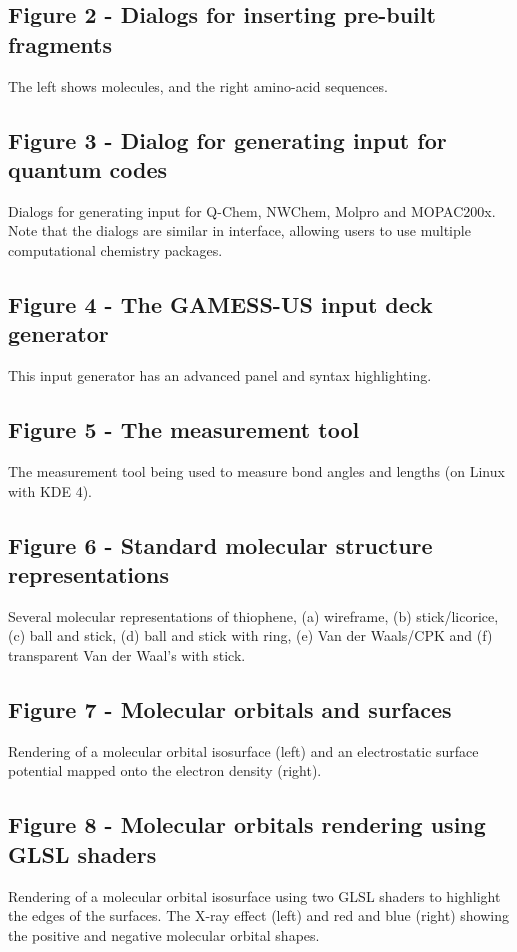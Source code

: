 \documentclass[10pt]{bmc_article}
\newenvironment{bmcformat}{\begin{raggedright}
  \baselineskip20pt\sloppy\setboolean{publ}{false}}{\end{raggedright}
  \baselineskip20pt\sloppy}
\begin{document}
\begin{bmcformat}
  \subsection*{Figure 2 - Dialogs for inserting pre-built fragments}
    The left shows molecules, and the right amino-acid sequences.

  \subsection*{Figure 3 - Dialog for generating input for quantum codes}
    Dialogs for generating input for Q-Chem, NWChem, Molpro and MOPAC200x.
    Note that the dialogs are similar in interface, allowing users to use
    multiple computational chemistry packages.

  \subsection*{Figure 4 - The GAMESS-US input deck generator}
    This input generator has an advanced panel and syntax highlighting.

  \subsection*{Figure 5 - The measurement tool}
    The measurement tool being used to measure bond angles and lengths
    (on Linux with KDE 4).

  \subsection*{Figure 6 - Standard molecular structure representations}
    Several molecular representations of thiophene, (a) wireframe,
    (b) stick/licorice, (c) ball and stick, (d) ball and stick with ring,
    (e) Van der Waals/CPK and (f) transparent Van der Waal's with stick.

  \subsection*{Figure 7 - Molecular orbitals and surfaces}
    Rendering of a molecular orbital isosurface (left) and an electrostatic
    surface potential mapped onto the electron density (right).

  \subsection*{Figure 8 - Molecular orbitals rendering using GLSL shaders}
    Rendering of a molecular orbital isosurface using two GLSL shaders to
    highlight the edges of the surfaces. The X-ray effect (left) and red and blue (right)
    showing the positive and negative molecular orbital shapes.


\end{bmcformat}
\end{document}
